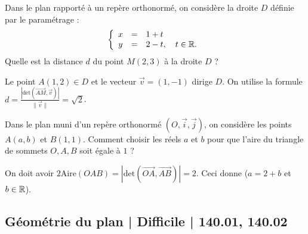 \begin{question}

Dans le plan rapporté à un repère orthonormé, on considère la droite $D$ d\'efinie par le paramétrage :
$$\left\{\begin{array}{ccl}x&=&1+t\\ y&=&2-t,\quad t\in \mathbb{R}.
\end{array}\right.$$
Quelle est la distance $d$ du point $M(2,3)$ à la droite $D$ ?
\begin{answers}  
\end{answers}
\begin{explanations}
Le point $A(1,2)\in D$ et le vecteur $\vec{v}=(1,-1)$ dirige $D$. On utilise la formule $\displaystyle d=\frac{\left|\mbox{det}\left(\overrightarrow{AM},\vec{v}\right)\right|}{\|\vec{v}\|}=\sqrt{2}$.
\end{explanations}
\end{question}



\begin{question}

Dans le plan muni d'un repère orthonormé $(O,\vec{i},\vec{j})$, on considère les points $\displaystyle A(a,b)$ et $\displaystyle B(1,1)$. Comment choisir les réels $a$ et $b$ pour que l'aire du triangle de sommets $O,A,B$ soit égale à $1$ ?
\begin{answers}  
\end{answers}
\begin{explanations}
On doit avoir $\displaystyle 2\mbox{Aire}(OAB)=\left|\mbox{det}\left(\overrightarrow{OA},\overrightarrow{AB}\right)\right|=2$. Ceci donne ($a=2+b$ et $b\in \mathbb{R}$).
\end{explanations}
\end{question}



\subsection{Géométrie du plan | Difficile | 140.01, 140.02}


